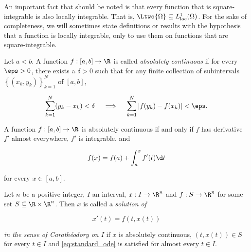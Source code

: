 An important fact that should be noted is that every function that is square-integrable is also locally integrable. That is, $\Ltwo{\Omega} \subseteq L^{1}_\text{loc}(\Omega)$. For the sake of completeness, we will sometimes state definitions or results with the hypothesis that a function is locally integrable, only to use them on functions that are square-integrable.

\begin{definition}{}{}
    Let $a < b$. A function $f: [a, b] \to \R$ is called \emph{absolutely continuous} if for every $\eps > 0$, there exists a $\delta > 0$ such that for any finite collection of subintervals $\left\{ (x_k, y_k) \right\}_{k = 1}^{N}$ of $[a, b]$,

    \begin{equation*}
        \sum_{k = 1}^{N} (y_k - x_k) < \delta \quad \implies \quad \sum_{k = 1}^{N} \left| f(y_k) - f(x_k) \right| < \eps.
    \end{equation*}
\end{definition}

\begin{proposition}{}{}
    A function $f: [a, b] \to \R$ is absolutely continuous if and only if $f$ has derivative $f'$ almost everywhere, $f'$ is integrable, and

    \begin{equation*}
        f(x) = f(a) + \int_{a}^{x} f'(t) \d t
    \end{equation*}

    for every $x \in [a, b]$.
\end{proposition}

\begin{definition}{}{}
    Let $n$ be a positive integer, $I$ an interval, $x: I \to \R^n$ and $f: S \to \R^n$ for some set $S \subseteq \R \times \R^n$. Then $x$ is called a \emph{solution of}

    \begin{equation}\label{eq:standard_ode}
        x'(t) = f(t, x(t))
    \end{equation}

    \emph{in the sense of Carath\'eodory on $I$} if $x$ is absolutely continuous, $(t, x(t)) \in S$ for every $t \in I$ and \cref{eq:standard_ode} is satisfied for almost every $t \in I$.
\end{definition}

